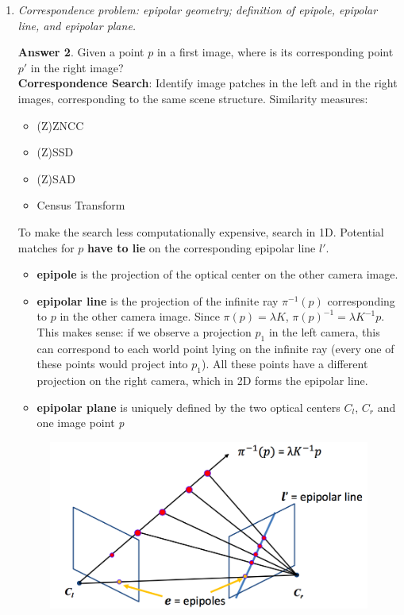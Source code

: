 \documentclass[a4paper,12 pt]{article}
\theoremstyle{definition}
\theoremstyle{remark}
\theoremstyle{definition}
\theoremstyle{definition}
\theoremstyle{definition}
\theoremstyle{definition}
\theoremstyle{remark}
\theoremstyle{remark}
\theoremstyle{definition}
\theoremstyle{definition}
\newtheorem*{answer}{Answer}
\begin{document}
\begin{enumerate}
\begin{enumerate}
\begin{answer}
\end{answer}
\item \textit{Correspondence problem: epipolar geometry; definition of epipole, epipolar line, and epipolar plane.}
\begin{answer}
Given a point $p$ in a first image, where is its corresponding point $p'$ in the right image? \\
\textbf{Correspondence Search}: Identify image patches in the left and in the right images, corresponding to the same scene structure. Similarity measures:
\begin{itemize}
\item (Z)ZNCC
\item (Z)SSD
\item (Z)SAD
\item Census Transform
\end{itemize}
To make the search less computationally expensive, search in 1D. Potential matches for $p$ \textbf{have to lie} on the corresponding epipolar line $l'$.
\begin{itemize}
\item \textbf{epipole} is the projection of the optical center on the other camera image.
\item \textbf{epipolar line} is the projection of the infinite ray $\pi^{-1}(p)$ corresponding to $p$ in the other camera image. Since $\pi(p)=\lambda K$, $\pi(p)^{-1}=\lambda K^{-1}p$. This makes sense: if we observe a projection $p_1$ in the left camera, this can correspond to each world point lying on the infinite ray (every one of these points would project into $p_1$). All these points have a different projection on the right camera, which in 2D forms the epipolar line.
\item \textbf{epipolar plane} is uniquely defined by the two optical centers $C_l$, $C_r$ and one image point \textit{p}
\end{itemize}
\begin{figure}[h!]
\begin{center}
\includegraphics[scale=0.4]{pics/epi}

\end{center}
\end{figure}
\end{answer}
\end{enumerate}
\end{enumerate}
\end{document}
